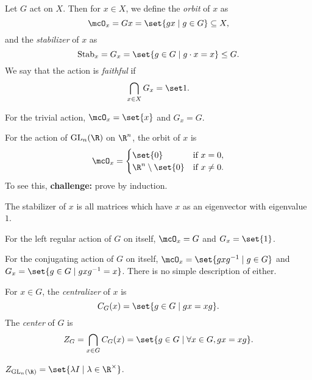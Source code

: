 \begin{definition*} \label{def:orbit}
    Let $G$ act on $X$.
    Then for $x \in X$, we define the \emph{orbit} of $x$ as \[
        \mcO_x = G x = \set{g x \mid g \in G} \subseteq X,
    \] and the \emph{stabilizer} of $x$ as \[
        \stab_x = G_x = \set{g \in G \mid g \cdot x = x} \le G.
    \] We say that the action is \emph{faithful} if \[
        \bigcap_{x \in X} G_x = \set 1.
    \]
\end{definition*}
\begin{examples}
    \item For the trivial action, $\mcO_x = \set{x}$ and $G_x = G$.
    \item For the action of $\GL_n(\R)$ on $\R^n$, the orbit of $x$ is \[
        \mcO_x = \begin{cases}
            \set{0} & \text{if } x = 0, \\
            \R^n \setminus \set{0} & \text{if } x \ne 0.
        \end{cases}
    \] To see this, \textbf{challenge:} prove by induction.

    The stabilizer of $x$ is all matrices which have $x$ as an eigenvector
    with eigenvalue $1$.
    \item For the left regular action of $G$ on itself,
        $\mcO_x = G$ and $G_x = \set{1}$.
    \item For the conjugating action of $G$ on itself,
        $\mcO_x = \set{gxg^{-1} \mid g \in G}$ and
        $G_x = \set{g \in G \mid gxg^{-1} = x}$.
        There is no simple description of either.
\end{examples}

\begin{definition} \label{def:center}
    For $x \in G$, the \emph{centralizer} of $x$ is \[
        C_G(x) = \set{g \in G \mid gx = xg}.
    \] The \emph{center} of $G$ is \[
        Z_G = \bigcap_{x \in G} C_G(x)
            = \set{g \in G \mid \forall x \in G, gx = xg}.
    \]
\end{definition}
\begin{example}
    $Z_{\GL_n(\R)} = \set{\lambda I \mid \lambda \in \R^\times}$.
\end{example}

